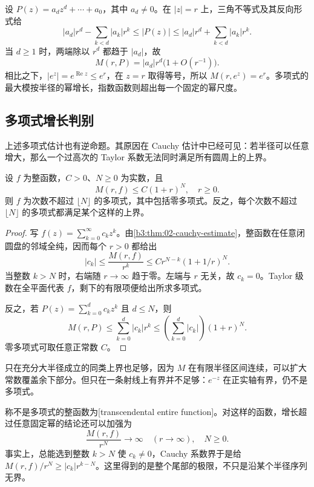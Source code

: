 \ProseParagraphBreak

设 \(P(z)=a_dz^d+\cdots+a_0\)，其中 \(a_d\ne0\)。在 \(|z|=r\) 上，三角不等式及其反向形式给
\[
 |a_d|r^d-\sum_{k<d}|a_k|r^k
 \le |P(z)|
 \le |a_d|r^d+\sum_{k<d}|a_k|r^k.
\]
当 \(d\ge1\) 时，两端除以 \(r^d\) 都趋于 \(|a_d|\)，故
\[
 M(r,P)=|a_d|r^d\bigl(1+O(r^{-1})\bigr).
\]
相比之下，\(|e^z|=e^{\operatorname{Re}z}\le e^r\)，在 \(z=r\) 取得等号，所以 \(M(r,e^z)=e^r\)。多项式的最大模按半径的幂增长，指数函数则超出每一个固定的幂尺度。

\subsection{多项式增长判别}
\label{b3:subsec:190102}

上述多项式估计也有逆命题。其原因在 Cauchy 估计中已经可见：若半径可以任意增大，那么一个过高次的 Taylor 系数无法同时满足所有圆周上的上界。

\begin{proposition}[多项式增长判别]\label{b3:prop:19-polynomial-growth}
设 \(f\) 为整函数，\(C>0\)、\(N\ge0\) 为实数，且
\[
 M(r,f)\le C(1+r)^N,\quad r\ge0.
\]
则 \(f\) 为次数不超过 \(\lfloor N\rfloor\) 的多项式，其中包括零多项式。反之，每个次数不超过 \(\lfloor N\rfloor\) 的多项式都满足某个这样的上界。
\end{proposition}
\begin{proof}
写 \(f(z)=\sum_{k=0}^{\infty}c_kz^k\)。由\cref{b3:thm:02-cauchy-estimate}，整函数在任意闭圆盘的邻域全纯，因而每个 \(r>0\) 都给出
\[
 |c_k|\le\frac{M(r,f)}{r^k}
 \le C r^{N-k}(1+1/r)^N.
\]
当整数 \(k>N\) 时，右端随 \(r\to\infty\) 趋于零。左端与 \(r\) 无关，故 \(c_k=0\)。Taylor 级数在全平面代表 \(f\)，剩下的有限项便给出所求多项式。

反之，若 \(P(z)=\sum_{k=0}^d c_kz^k\) 且 \(d\le N\)，则
\[
 M(r,P)\le\sum_{k=0}^d|c_k|r^k
 \le\left(\sum_{k=0}^d|c_k|\right)(1+r)^N.
\]
零多项式可取任意正常数 \(C\)。
\end{proof}
只在充分大半径成立的同类上界也足够，因为 \(M\) 在有限半径区间连续，可以扩大常数覆盖余下部分。但只在一条射线上有界并不足够：\(e^{-z}\) 在正实轴有界，仍不是多项式。

\ProseParagraphBreak

称不是多项式的整函数为[transcendental entire function]。对这样的函数，增长超过任意固定幂的结论还可以加强为
\[
 \frac{M(r,f)}{r^N}\longrightarrow\infty
 \quad(r\to\infty),\quad N\ge0.
\]
事实上，总能选到整数 \(k>N\) 使 \(c_k\ne0\)，Cauchy 系数界于是给 \(M(r,f)/r^N\ge|c_k|r^{k-N}\)。这里得到的是整个尾部的极限，不只是沿某个半径序列无界。

